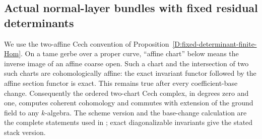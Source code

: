 \subsection{Actual normal-layer bundles with fixed residual determinants}

We use the two-affine Cech convention of
Proposition~\ref{D:fixed-determinant-finite-Hom}. On a tame gerbe
over a proper curve, ``affine chart'' below means the inverse image
of an affine coarse open. Such a chart and the intersection of two
such charts are cohomologically affine: the exact invariant functor
followed by the affine section functor is exact. This remains true
after every coefficient-base change. Consequently the ordered
two-chart Cech complex, in degrees zero and one, computes coherent
cohomology and commutes with extension of the ground field to any
$k$-algebra. The scheme version and the base-change calculation are
the complete statements used in
\citep[Tags 0BDX, 01XD and 02KE]{C_StacksFiniteCechHom}; exact
diagonalizable invariants give the stated stack version.

